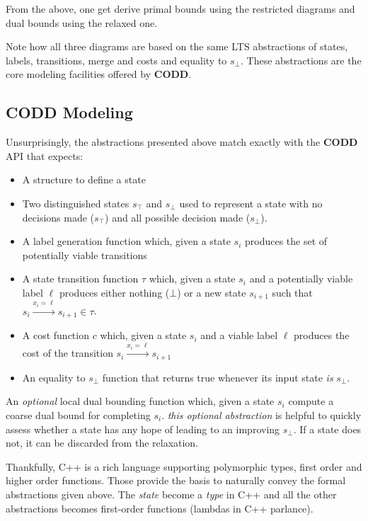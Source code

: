 \documentclass[11pt]{article}
\begin{document}
From the above, one get derive primal bounds using the restricted diagrams and dual bounds using the relaxed one.

\begin{important}
Note how all three diagrams are based on the same LTS abstractions of states, labels, transitions, merge and costs and equality to \(s_\bot\). These abstractions are the core
modeling facilities offered by \textbf{CODD}. 
\end{important}

\subsection{\textbf{CODD} Modeling}
\label{sec:org0da3f9b}
Unsurprisingly, the abstractions presented above match exactly with the \textbf{CODD} API that expects:
\begin{itemize}
\item A structure to define a state
\item Two distinguished states \(s_\top\) and \(s_\bot\) used to represent a state with no decisions made (\(s_\top\)) and all possible decision made (\(s_\bot\)).
\item A label generation function which, given a state \(s_i\) produces the set of potentially viable transitions
\item A state transition function \(\tau\) which, given a state \(s_i\) and a potentially viable label \(\ell\) produces either nothing (\(\bot\)) or a new state \(s_{i+1}\) such that
\(s_i \stackrel{x_i=\ell}{\longrightarrow} s_{i+1} \in \tau\).
\item A cost function \(c\) which, given a state \(s_i\) and a viable label \(\ell\) produces the cost of the transition \(s_i \stackrel{x_i=\ell}{\longrightarrow} s_{i+1}\)
\item An equality to \(s_\bot\) function that returns true whenever its input state \emph{is} \(s_\bot\).
\end{itemize}

\begin{note}
An \emph{optional} local dual bounding function which, given a state \(s_i\) compute a coarse dual bound for completing \(s_i\). \emph{this optional abstraction} is helpful to quickly assess whether a state has any hope of leading to an improving \(s_\bot\). If a state does not, it can be discarded from the relaxation.
\end{note}
Thankfully, C++ is a rich language supporting polymorphic types, first order and higher order functions. Those provide the basis to naturally convey the formal abstractions given above. The \emph{state} become a \emph{type} in C++ and all the other abstractions becomes first-order functions (lambdas in C++ parlance).
\end{document}
